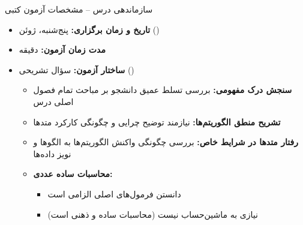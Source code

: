 \begin{frame}{سازماندهی درس -- مشخصات آزمون کتبی}
\begin{itemize}
  \item \textbf{تاریخ و زمان برگزاری:} پنج‌شنبه،  ژوئن  ()
  \item \textbf{مدت زمان آزمون:}  دقیقه
  \item \textbf{ساختار آزمون:}  سؤال تشریحی ()
  \begin{itemize}
    \item \textbf{سنجش درک مفهومی:} بررسی تسلط عمیق دانشجو بر مباحث تمام فصول اصلی درس
    \item \textbf{تشریح منطق الگوریتم‌ها:} نیازمند توضیح چرایی و چگونگی کارکرد متدها
    \item \textbf{رفتار متدها در شرایط خاص:} بررسی چگونگی واکنش الگوریتم‌ها به الگوها و نویز داده‌ها
    \item \textbf{محاسبات ساده عددی:}
    \begin{itemize}
      \item دانستن فرمول‌های اصلی الزامی است
      \item نیازی به ماشین‌حساب نیست (محاسبات ساده و ذهنی است)
    \end{itemize}
  \end{itemize}
\end{itemize}
\end{frame}

